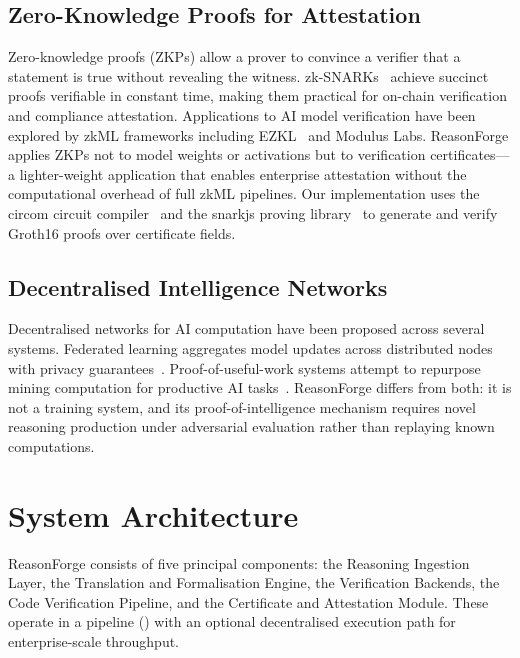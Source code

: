 \documentclass[11pt,a4paper]{article}
\begin{document}
\subsection{Zero-Knowledge Proofs for Attestation}

Zero-knowledge proofs (ZKPs) allow a prover to convince a verifier that a
statement is true without revealing the witness.
zk-SNARKs~\citep{groth2016size} achieve succinct proofs verifiable in
constant time, making them practical for on-chain verification and
compliance attestation.  Applications to AI model verification have been
explored by zkML frameworks including EZKL~\citep{kang2023ezkl} and
Modulus Labs.  ReasonForge applies ZKPs not to model weights or
activations but to verification certificates---a lighter-weight
application that enables enterprise attestation without the computational
overhead of full zkML pipelines.  Our implementation uses the circom
circuit compiler~\citep{circom2022} and the snarkjs proving
library~\citep{snarkjs2022} to generate and verify Groth16 proofs over
certificate fields.

\subsection{Decentralised Intelligence Networks}

Decentralised networks for AI computation have been proposed across
several systems.  Federated learning aggregates model updates across
distributed nodes with privacy guarantees~\citep{mcmahan2017federated}.
Proof-of-useful-work systems attempt to repurpose mining computation for
productive AI tasks~\citep{dao2022proof}.  ReasonForge differs from both:
it is not a training system, and its proof-of-intelligence mechanism
requires novel reasoning production under adversarial evaluation rather
than replaying known computations.

\section{System Architecture}
\label{sec:architecture}

ReasonForge consists of five principal components: the Reasoning
Ingestion Layer, the Translation and Formalisation Engine, the
Verification Backends, the Code Verification Pipeline, and the
Certificate and Attestation Module.  These operate in a pipeline
() with an optional decentralised execution path for
enterprise-scale throughput.
\end{document}
